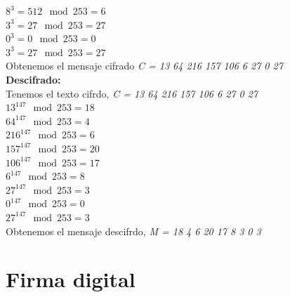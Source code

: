 \textit{$ 8^{3} = 512 \mod 253 = 6 $}\\

\textit{$ 3^{3} = 27 \mod 253 = 27 $}\\

\textit{$ 0^{3} = 0 \mod 253 = 0 $}\\

\textit{$ 3^{3} = 27 \mod 253 = 27 $}\\

Obtenemos el mensaje cifrado \textit{ C = 13 64 216 157 106 6 27 0 27} \\

\textbf{Descifrado: } \\

Tenemos el texto cifrdo, \textit{ C = 13 64 216 157 106 6 27 0 27} \\

\textit{$ 13^{147} \mod 253 = 18$} \\

\textit{$ 64^{147} \mod 253 = 4$} \\

\textit{$ 216^{147} \mod 253 = 6$} \\

\textit{$ 157^{147} \mod 253 = 20$} \\

\textit{$ 106^{147} \mod 253 = 17$} \\

\textit{$ 6^{147} \mod 253 = 8$} \\

\textit{$ 27^{147} \mod 253 = 3$} \\

\textit{$ 0^{147} \mod 253 = 0$} \\

\textit{$ 27^{147} \mod 253 = 3$} \\

Obtenemos el mensaje descifrdo, \textit{ M = 18 4 6 20 17 8 3 0 3} \\



\section{Firma digital}

